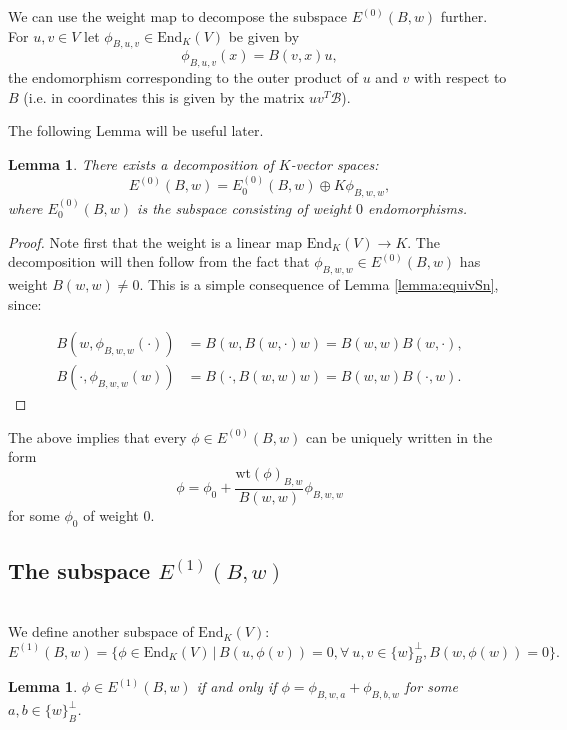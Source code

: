 \documentclass{amsart}
\theoremstyle{plain}
\newtheorem{lemma}[theorem]{Lemma}
\theoremstyle{definition}
\begin{document}
We can use the weight map to decompose the subspace $E^{(0)}(B,w)$ further. For $u,v\in V$ let $\phi_{B,u,v}\in\text{End}_K(V)$ be given by \[\phi_{B,u,v}(x) = B(v,x)u,\] the endomorphism corresponding to the outer product of $u$ and $v$ with respect to $B$ (i.e. in coordinates this is given by the matrix $uv^T \mathcal{B}$).

The following Lemma will be useful later.

\begin{lemma}
There exists a decomposition of $K$-vector spaces: \[E^{(0)}(B,w) = E^{(0)}_0(B,w)\oplus K\phi_{B,w,w},\] where $E^{(0)}_0(B,w)$ is the subspace consisting of weight $0$ endomorphisms.
\end{lemma}
\begin{proof}
Note first that the weight is a linear map $\text{End}_K(V) \rightarrow K$. The decomposition will then follow from the fact that $\phi_{B,w,w} \in E^{(0)}(B,w)$ has weight $B(w,w) \neq 0$. This is a simple consequence of Lemma \ref{lemma:equivSn}, since:

\begin{align*}
B(w, \phi_{B,w,w}(\cdot)) &= B(w,B(w,\cdot)w) = B(w,w)B(w,\cdot),\\
B(\cdot, \phi_{B,w,w}(w)) &= B(\cdot, B(w,w)w) = B(w,w)B(\cdot,w).
\end{align*}
\end{proof}

The above implies that every $\phi\in E^{(0)}(B,w)$ can be uniquely written in the form \[\phi = \phi_0 + \frac{\text{wt}(\phi)_{B,w}}{B(w,w)}\phi_{B,w,w}\] for some $\phi_0$ of weight $0$.

\subsection{The subspace $E^{(1)}(B,w)$}
\hfill\\

We define another subspace of $\text{End}_K(V)$: 
\begin{equation*}
    E^{(1)}(B,w) = \{ \phi \in \text{End}_K(V) \,|\, B(u, \phi(v)) =0, \forall \ u,v \in \{w\}_B^\perp, B(w, \phi(w)) =0 \}.
\end{equation*}

\begin{lemma}
\label{lemma:equivVn}
$\phi \in E^{(1)}(B,w)$ if and only if $\phi =\phi_{B,w,a}+\phi_{B,b,w}$ for some $a,b \in \{w\}_B^\perp$.
\end{lemma}
\end{document}
